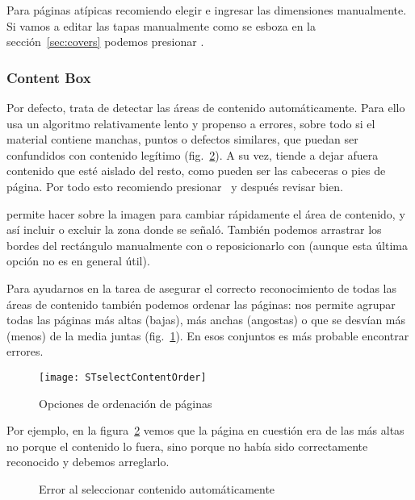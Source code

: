\documentclass[%
	a5paper,
	10pt,
	twoside,
	openright,
	final,
]{memoir}
\begin{document}
	Para páginas atípicas recomiendo elegir  e ingresar las dimensiones manualmente. Si vamos a editar las tapas manualmente como se esboza en la sección~\ref{sec:covers} podemos presionar .

	\subsubsection{Content Box} Por defecto, \scantailor trata de detectar las áreas de contenido automáticamente. Para ello usa un algoritmo relativamente lento y propenso a errores, sobre todo si el material contiene manchas, puntos o defectos similares, que puedan ser confundidos con contenido legítimo (fig.~\ref{fig:STselectContentError}). A su vez, tiende a dejar afuera contenido que esté aislado del resto, como pueden ser las cabeceras o pies de página. Por todo esto recomiendo presionar \play\ y después revisar bien.

	\scantailorAdvanced permite hacer \menu{\leftclick\,\leftclick} sobre la imagen para cambiar rápidamente el área de contenido, y así incluir o excluir la zona donde se señaló. También podemos arrastrar los bordes del rectángulo manualmente con  o reposicionarlo con  (aunque esta última opción no es en general útil).

	Para ayudarnos en la tarea de asegurar el correcto reconocimiento de todas las áreas de contenido también podemos ordenar las páginas:  nos permite agrupar todas las páginas más altas (bajas), más anchas (angostas) o que se desvían más (menos) de la media juntas (fig.~\ref{fig:STselectContentOrder}). En esos conjuntos es más probable encontrar errores.

	\begin{figure}
		\centering
		\texttt{[image: STselectContentOrder]}
		\caption{Opciones de ordenación de páginas\label{fig:STselectContentOrder}}
	\end{figure}

	Por ejemplo, en la figura~\ref{fig:STselectContentError} vemos que la página en cuestión era de las más altas no porque el contenido lo fuera, sino porque no había sido correctamente reconocido y debemos arreglarlo.

	\begin{figure}
		\centering
		\caption{Error al seleccionar contenido automáticamente\label{fig:STselectContentError}}
	\end{figure}
\end{document}
